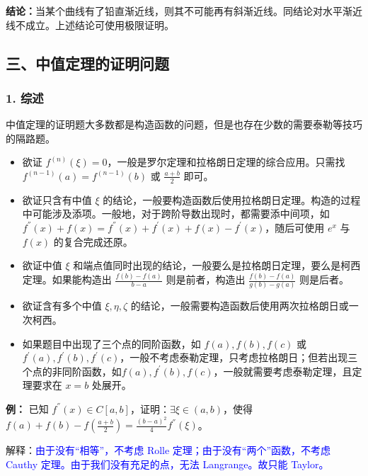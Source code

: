 \documentclass[b5paper]{ctexart}
\begin{document}
	\textbf{结论：}当某个曲线有了铅直渐近线，则其不可能再有斜渐近线。同结论对水平渐近线不成立。上述结论可使用极限证明。
	
	\subsection*{三、中值定理的证明问题}
	
	\subsubsection*{1. 综述}
	中值定理的证明题大多数都是构造函数的问题，但是也存在少数的需要泰勒等技巧的隔路题。

	\begin{itemize}
		\item 欲证 $f^{(n)}(\xi) = 0$，一般是罗尔定理和拉格朗日定理的综合应用。只需找 $f^{(n - 1)}(a) = f^{(n - 1)}(b)$ 或 $\frac{a + b}{2}$ 即可。
		
		\item 欲证只含有中值 $\xi$ 的结论，一般要构造函数后使用拉格朗日定理。构造的过程中可能涉及添项。一般地，对于跨阶导数出现时，都需要添中间项，如 $f^{''}(x) +f(x) = f^{''}(x) +f^{'}(x) + f(x) - f^{'}(x) $，随后可使用 $e^x$ 与 $f(x)$ 的复合完成还原。
		
		\item 欲证中值 $\xi$ 和端点值同时出现的结论，一般要么是拉格朗日定理，要么是柯西定理。如果能构造出 $\frac{f(b) - f(a)}{b - a}$ 则是前者，构造出 $\frac{f(b) - f(a)}{g(b) - g(a)}$ 则是后者。
		
		\item 欲证含有多个中值 $\xi, \eta, \zeta$ 的结论，一般需要构造函数后使用两次拉格朗日或一次柯西。
		
		\item 如果题目中出现了三个点的同阶函数，如 $f(a), f(b), f(c)$ 或 $f^{'}(a), f^{'}(b), f^{'}(c)$，一般不考虑泰勒定理，只考虑拉格朗日；但若出现三个点的非同阶函数，如$f(a), f^{'}(b), f(c)$，一般就需要考虑泰勒定理，且定理要求在 $x = b$ 处展开。
	\end{itemize}
	
	\textbf{例：} 已知 $f^{''}(x) \in C[a,b]$，证明：$\exists \xi \in (a, b)$，使得 $f(a) + f(b) - f(\frac{a + b}{2}) = \frac{(b - a)^2}{4} f^{''}(\xi)$。
	\vspace{12pt}
	
	解释：{\kaishu \textcolor{blue}{由于没有“相等”，不考虑 Rolle 定理；由于没有“两个”函数，不考虑 Cauthy 定理。由于我们没有充足的点，无法 Langrange。故只能 Taylor。}}
\end{document}
